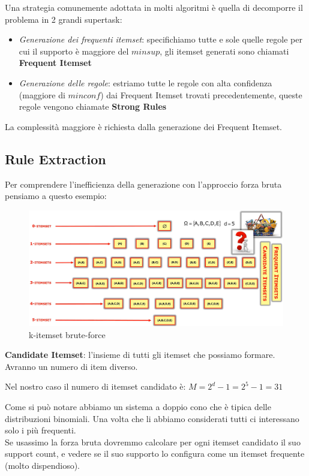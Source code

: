 Una strategia comunemente adottata in molti algoritmi è quella di decomporre il problema in 2 grandi supertask:
\begin{itemize}
	\item\textit{Generazione dei frequenti itemset}: specifichiamo tutte e sole quelle regole per cui il supporto è maggiore del $minsup$, gli itemset generati sono chiamati \textbf{Frequent Itemset}
	\item \textit{Generazione delle regole}: estriamo tutte le regole con alta confidenza (maggiore di $minconf$) dai Frequent Itemset trovati precedentemente, queste regole vengono chiamate \textbf{Strong Rules}
\end{itemize}
\noindent
La complessità maggiore è richiesta dalla generazione dei Frequent Itemset.


\subsection{Rule Extraction}

Per comprendere l'inefficienza della generazione con l'approccio forza bruta pensiamo a questo esempio:
\begin{figure}[H]
	\hspace{-0.7 cm}
	\includegraphics[height=0.5 \linewidth]{association/pict/k-itemset.png}
	\caption{k-itemset brute-force}
\end{figure}
\begin{defn}
	\textbf{Candidate Itemset}: l'insieme di tutti gli itemset che possiamo formare. Avranno un numero di item diverso. 
\end{defn}
Nel nostro caso il numero di itemset candidato è: $M = 2^{d} - 1 = 2^5 -1 = 31$

Come si può notare abbiamo un sistema a doppio cono che è tipica delle distribuzioni binomiali. Una volta che li abbiamo considerati tutti ci interessano solo i più frequenti. \\
Se usassimo la forza bruta dovremmo calcolare per ogni itemset candidato il suo support count, e vedere se il suo supporto lo configura come un itemset frequente (molto dispendioso). 

